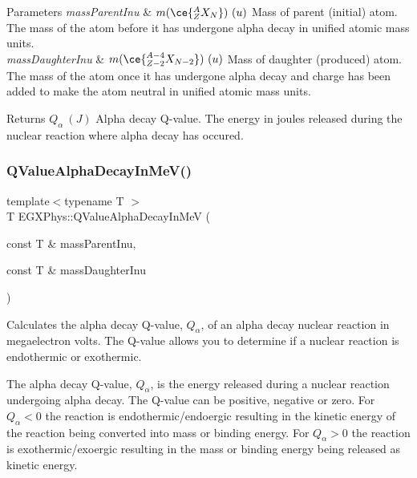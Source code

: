 \begin{DoxyParams}{Parameters}
{\em mass\+Parent\+Inu} & $m(\ce{ ^{A}_{Z}X_{N} })\ (u)$ Mass of parent (initial) atom. The mass of the atom before it has undergone alpha decay in unified atomic mass units. \\
\hline
{\em mass\+Daughter\+Inu} & $m(\ce{ ^{A-4}_{Z{-2}}X_{N-2} })\ (u)$ Mass of daughter (produced) atom. The mass of the atom once it has undergone alpha decay and charge has been added to make the atom neutral in unified atomic mass units. \\
\hline
\end{DoxyParams}
\begin{DoxyReturn}{Returns}
$Q_{\alpha}\ (J)$ Alpha decay Q-\/value. The energy in joules released during the nuclear reaction where alpha decay has occured. 
\end{DoxyReturn}
\mbox{\label{group___q_value_ga18e054c21cd5f87744e9f5aadc959a54}} 
\subsubsection{\texorpdfstring{Q\+Value\+Alpha\+Decay\+In\+Me\+V()}{QValueAlphaDecayInMeV()}}
{\footnotesize\ttfamily template$<$typename T $>$ \\
T E\+G\+X\+Phys\+::\+Q\+Value\+Alpha\+Decay\+In\+MeV (\begin{DoxyParamCaption}\item[{const T \&}]{mass\+Parent\+Inu,  }\item[{const T \&}]{mass\+Daughter\+Inu }\end{DoxyParamCaption})}



Calculates the alpha decay Q-\/value, $Q_{\alpha}$, of an alpha decay nuclear reaction in megaelectron volts. The Q-\/value allows you to determine if a nuclear reaction is endothermic or exothermic. 

The alpha decay Q-\/value, $Q_{\alpha}$, is the energy released during a nuclear reaction undergoing alpha decay. The Q-\/value can be positive, negative or zero. For $Q_{\alpha} < 0$ the reaction is endothermic/endoergic resulting in the kinetic energy of the reaction being converted into mass or binding energy. For $Q_{\alpha} > 0$ the reaction is exothermic/exoergic resulting in the mass or binding energy being released as kinetic energy.

